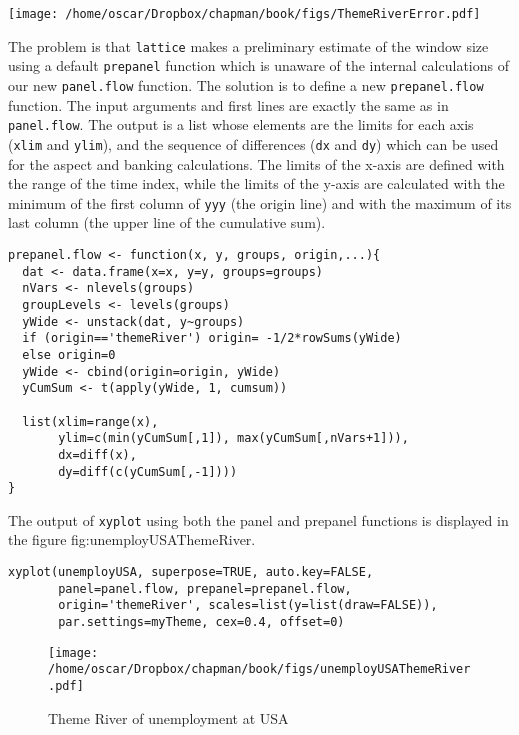 \texttt{[image: /home/oscar/Dropbox/chapman/book/figs/ThemeRiverError.pdf]}

The problem is that \texttt{lattice} makes a preliminary estimate of the
window size using a default \texttt{prepanel} function which is unaware
of the internal calculations of our new \texttt{panel.flow} function. The
solution is to define a new \texttt{prepanel.flow} function. The input
arguments and first lines are exactly the same as in
\texttt{panel.flow}. The output is a list whose elements are the limits
for each axis (\texttt{xlim} and \texttt{ylim}), and the sequence of differences
(\texttt{dx} and \texttt{dy}) which can be used for the aspect and banking
calculations. The limits of the x-axis are defined with the range
of the time index, while the limits of the y-axis are calculated
with the minimum of the first column of \texttt{yyy} (the origin line)
and with the maximum of its last column (the upper line of the
cumulative sum).


\lstset{language=R}
\begin{lstlisting}
prepanel.flow <- function(x, y, groups, origin,...){
  dat <- data.frame(x=x, y=y, groups=groups)
  nVars <- nlevels(groups)
  groupLevels <- levels(groups)
  yWide <- unstack(dat, y~groups)
  if (origin=='themeRiver') origin= -1/2*rowSums(yWide)
  else origin=0
  yWide <- cbind(origin=origin, yWide)
  yCumSum <- t(apply(yWide, 1, cumsum))

  list(xlim=range(x),
       ylim=c(min(yCumSum[,1]), max(yCumSum[,nVars+1])),
       dx=diff(x),
       dy=diff(c(yCumSum[,-1])))
}
\end{lstlisting}

The output of \texttt{xyplot} using both the panel and prepanel functions
is displayed in the figure fig:unemployUSAThemeRiver.


\lstset{language=R}
\begin{lstlisting}
xyplot(unemployUSA, superpose=TRUE, auto.key=FALSE,
       panel=panel.flow, prepanel=prepanel.flow,
       origin='themeRiver', scales=list(y=list(draw=FALSE)),
       par.settings=myTheme, cex=0.4, offset=0)
\end{lstlisting}

\begin{figure}[htb]
\centering
\texttt{[image: /home/oscar/Dropbox/chapman/book/figs/unemployUSAThemeRiver.pdf]}
\caption{\label{fig:unemployUSAThemeRiver}Theme River of unemployment at USA}
\end{figure}
